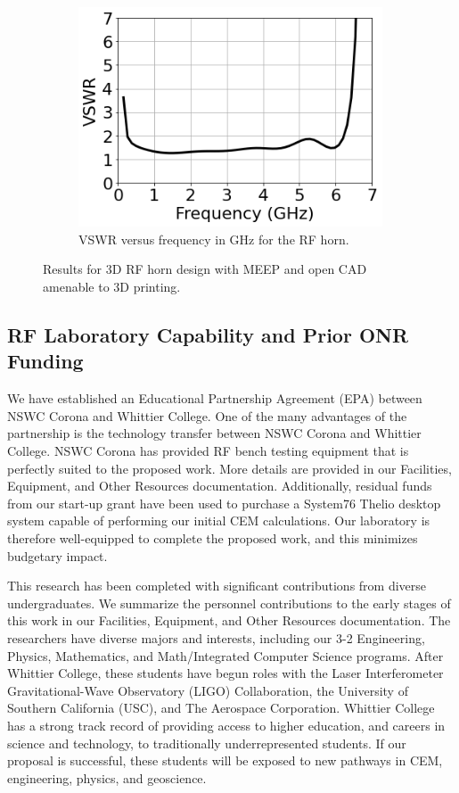 \documentclass[11pt]{amsart}
\begin{document}
\begin{figure}[ht]
\begin{subfigure}{0.65\textwidth}
\end{subfigure}
\hfill
\begin{subfigure}{0.3\textwidth}
    \includegraphics[width=0.99\textwidth]{figures/vswr.png}
	\caption{VSWR versus frequency in GHz for the RF horn.}
\end{subfigure}
\caption{Results for 3D RF horn design with MEEP and open CAD amenable to 3D printing.}
\label{fig:3d_cad}
\end{figure}

\subsection{RF Laboratory Capability and Prior ONR Funding}

We have established an Educational Partnership Agreement (EPA) between NSWC Corona and Whittier College.  One of the many advantages of the partnership is the technology transfer between NSWC Corona and Whittier College.  NSWC Corona has provided RF bench testing equipment that is perfectly suited to the proposed work.  More details are provided in our Facilities, Equipment, and Other Resources documentation.  Additionally, residual funds from our start-up grant have been used to purchase a System76 Thelio desktop system capable of performing our initial CEM calculations.  Our laboratory is therefore well-equipped to complete the proposed work, and this minimizes budgetary impact.  

This research has been completed with significant contributions from diverse undergraduates.  We summarize the personnel contributions to the early stages of this work in our Facilities, Equipment, and Other Resources documentation.  The researchers have diverse majors and interests, including our 3-2 Engineering, Physics, Mathematics, and Math/Integrated Computer Science programs.   After Whittier College, these students have begun roles with the Laser Interferometer Gravitational-Wave Observatory (LIGO) Collaboration, the University of Southern California (USC), and The Aerospace Corporation.  Whittier College has a strong track record of providing access to higher education, and careers in science and technology, to traditionally underrepresented students.  If our proposal is successful, these students will be exposed to new pathways in CEM, engineering, physics, and geoscience.
\end{document}
